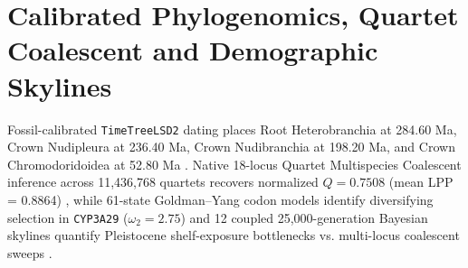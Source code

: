 \documentclass[10pt,letterpaper]{article}
\begin{document}
\section{Calibrated Phylogenomics, Quartet Coalescent and Demographic Skylines}
Fossil-calibrated \texttt{TimeTreeLSD2} dating places Root Heterobranchia at 284.60 Ma, Crown Nudipleura at 236.40 Ma, Crown Nudibranchia at 198.20 Ma, and Crown Chromodoridoidea at 52.80 Ma \cite{ref2,ref6,ref14}. Native 18-locus Quartet Multispecies Coalescent inference across 11,436,768 quartets recovers normalized $Q = 0.7508$ (mean LPP = 0.8864) \cite{ref15}, while 61-state Goldman--Yang codon models identify diversifying selection in \texttt{CYP3A29} ($\omega_2 = 2.75$) \cite{ref8,ref17} and 12 coupled 25,000-generation Bayesian skylines quantify Pleistocene shelf-exposure bottlenecks vs. multi-locus coalescent sweeps \cite{ref16}.
\end{document}
